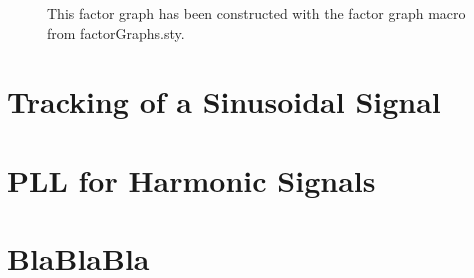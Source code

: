 \documentclass[11pt,a4paper,twoside]{report}
\begin{document}
\begin{figure}[h]
	\centering

  	\caption[Exemplary factor graph]
   	{This factor graph has been constructed with the factor graph macro from factorGraphs.sty.}
	\label{factor_graph}
\end{figure}

\clearpage


\chapter{Tracking of a Sinusoidal Signal}


\chapter{PLL for Harmonic Signals}


\chapter{BlaBlaBla}






\fancyhead[LO]{\scshape\bibname}
\fancyhead[RO]{\scshape\appendixname}
\fancyhead[LE]{\scshape\appendixname}
\fancyhead[RE]{\scshape\bibname}



\end{document}
